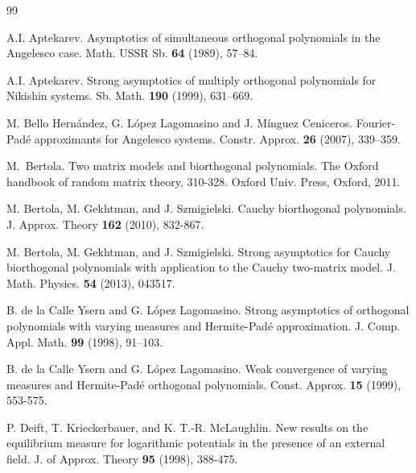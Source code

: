 \documentclass{amsart}
\numberwithin{equation}{section}
\theoremstyle{definition}
\begin{document}
\begin{thebibliography}{99}

     A.I. Aptekarev. Asymptotics of simultaneous orthogonal polynomials in the Angelesco case.  {Math. USSR Sb.} \textbf{64} (1989), 57--84.

     A.I. Aptekarev. Strong asymptotics of multiply orthogonal polynomials for Nikishin systems.  {Sb. Math.} \textbf{190} (1999), 631--669.


     M. Bello Hern\'andez, G. L\'opez Lagomasino and J. Mínguez Ceniceros.   Fourier-Pad\'e approximants for Angelesco systems. {Constr. Approx.} \textbf{26} (2007), 339--359.

     M.~Bertola. Two matrix models and biorthogonal polynomials. The Oxford handbook of random matrix theory, 310-328. Oxford Univ. Press, Oxford, 2011.


     M. Bertola, M. Gekhtman, and J. Szmigielski. Cauchy biorthogonal polynomials.  {J. Approx. Theory} \textbf{162} (2010), 832-867. %

     M. Bertola, M. Gekhtman, and J. Szmigielski. Strong asymptotics for Cauchy biorthogonal polynomials with application to the Cauchy two-matrix model.  {J. Math. Physics.} \textbf{54} (2013), 043517. %

     B. de la Calle Ysern and G. López Lagomasino. Strong asymptotics of orthogonal polynomials with varying measures and Hermite-Pad\' e approximation.  {J. Comp. Appl. Math.} \textbf{99} (1998), 91--103. %

     B. de la Calle Ysern and G. López Lagomasino. Weak convergence of varying measures and Hermite-Padé orthogonal polynomials.  Const. Approx. \textbf{15} (1999), 553-575.

     P. Deift, T. Krieckerbauer, and K. T.-R. McLaughlin. New results on the equilibrium measure for logarithmic potentials in the presence of an external field.  {J. of Approx. Theory} \textbf{95} (1998), 388-475. %


\end{thebibliography}
\end{document}
